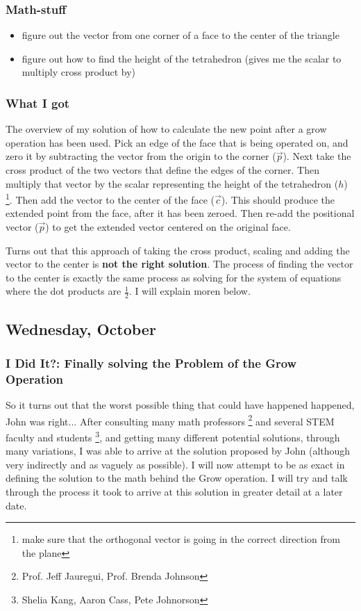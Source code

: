 \documentclass[letterpaper,oneside,titlepage]{article}
\begin{document}
\subsubsection{Math-stuff}
\begin{itemize}
\item figure out the vector from one corner of a face to the center of the triangle
\item figure out how to find the height of the tetrahedron (gives me the scalar to multiply cross product by)
\end{itemize}
\subsubsection{What I got}
The overview of my solution of how to calculate the new point after a grow operation has been used.  Pick an edge of the face that is being operated on, and zero it by subtracting the vector from the origin to the corner ($\overrightarrow{p}$).  Next take the cross product of the two vectors that define the edges of the corner. Then multiply that vector by the scalar representing the height of the tetrahedron ($h$) \footnote{make sure that the orthogonal vector is going in the correct direction from the plane}.  Then add the vector to the center of the face ($\overrightarrow{c}$).  This should produce the extended point from the face, after it has been zeroed.  Then re-add the positional vector ($\overrightarrow{p}$) to get the extended vector centered on the original face.
\par
Turns out that this approach of taking the cross product, scaling and adding the vector to the center is \textbf{not the right solution}.  The process of finding the vector to the center is exactly the same process as solving for the system of equations where the dot products are $\frac{1}{2}$.  I will explain moren below.

\subsection{Wednesday, October}
\subsubsection{I Did It?: Finally solving the Problem of the Grow Operation}
So it turns out that the worst possible thing that could have happened happened, John was right...  After consulting many math professors \footnote{Prof. Jeff Jauregui, Prof. Brenda Johnson} and several STEM faculty and students \footnote{Shelia Kang, Aaron Cass, Pete Johnorson}, and getting many different potential solutions, through many variations, I was able to arrive at the solution proposed by John (although very indirectly and as vaguely as possible).  I will now attempt to be as exact in defining the solution to the math behind the Grow operation.  I will try and talk through the process it took to arrive at this solution in greater detail at a later date.
\end{document}
